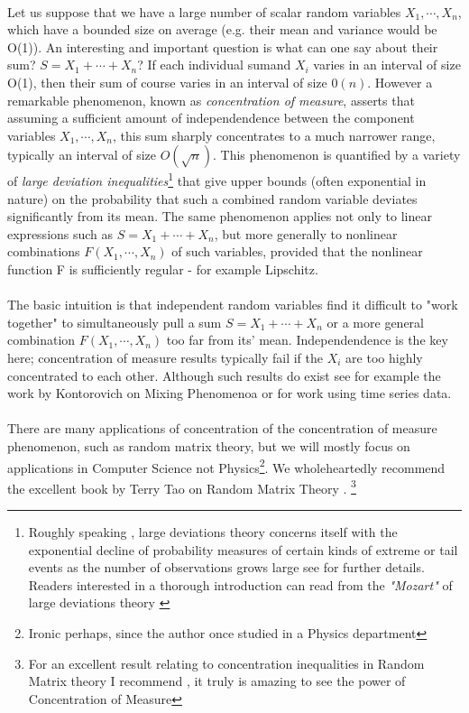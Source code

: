 \documentclass[12pt, oneside, a4paper]{article}
\theoremstyle{plain}
\theoremstyle{definition}
\begin{document}
\paragraph{} Let us suppose that we have a large number of scalar random variables $X_1, \cdots,X_n$, which have a bounded 
size on average (e.g. their mean and variance would be O(1)). An interesting and important question is
what can one say about their sum? $S = X_1 + \cdots + X_n$? If each individual sumand $X_i$ varies in an interval
of size O(1), then their sum of course varies in an interval of size $0(n)$. However a remarkable phenomenon,
known as \textit{concentration of measure}, asserts that assuming a sufficient amount of independendence between the 
component variables $X_1, \cdots,X_n$, this sum sharply concentrates to a much narrower range, typically an interval
of size $O(\sqrt{n})$. This phenomenon is quantified by a variety
 of \textit{large deviation inequalities}\footnote{Roughly speaking
, large deviations theory concerns itself with the exponential decline of probability measures of certain kinds of extreme
or tail events as the number of observations grows large see \cite{Touchette20091, LargeDeviations} for further details. 
Readers interested in a thorough introduction can read from the \textit{"Mozart"} of large deviations theory \cite{varadhan2008}}
that give upper bounds (often exponential in nature) on the probability that such a combined random variable deviates significantly 
from its mean. The same phenomenon applies not only to linear expressions such as $S = X_1 + \cdots + X_n$, but more 
generally to nonlinear combinations $F(X_1, \cdots,X_n)$ of such variables, provided that the nonlinear function F is sufficiently 
regular - for example Lipschitz. 
\paragraph{} The basic intuition is that independent random variables find it difficult to "work together" to 
simultaneously pull a sum $S = X_1 + \cdots + X_n$ or a more general combination $F(X_1, \cdots,X_n)$ too far from its' mean.
Independendence is the key here; concentration of measure results typically fail if the $X_i$ are too highly concentrated
to each other. Although such results do exist see for example the work by Kontorovich on Mixing Phenomenoa \cite{Kontorovich_Metric}
or \cite{McDonald_TimeSeries} for work using time series data. 
\paragraph{} There are many applications of concentration of the concentration of measure phenomenon, such as random 
matrix theory, but we will mostly focus on applications in Computer Science not Physics\footnote{Ironic perhaps, since the author
once studied in a Physics department}. We wholeheartedly recommend the excellent book by Terry Tao on Random Matrix
Theory \cite{tao2012topics}. \footnote{For an excellent result relating to concentration inequalities in Random Matrix theory
I recommend \cite{Tropp_FoCM_2011}, it truly is amazing to see the power of Concentration of Measure}
\end{document}

